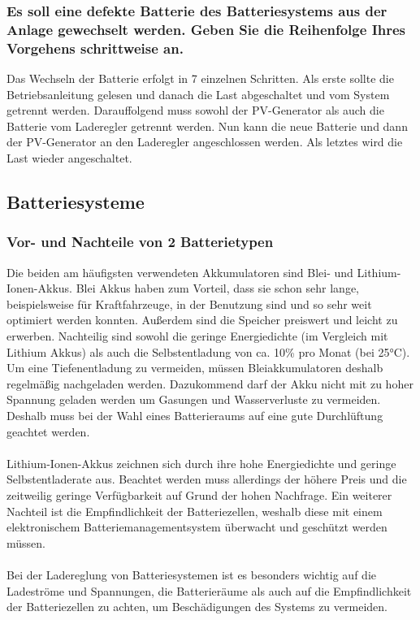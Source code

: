 \subsubsection{Es soll eine defekte Batterie des Batteriesystems aus der Anlage gewechselt werden. Geben Sie die Reihenfolge Ihres Vorgehens schrittweise an.}
Das Wechseln der Batterie erfolgt in 7 einzelnen Schritten. Als erste sollte die Betriebsanleitung gelesen und danach die Last abgeschaltet und vom System getrennt werden. Darauffolgend muss sowohl der PV-Generator als auch die Batterie vom Laderegler getrennt werden. Nun kann die neue Batterie und dann der PV-Generator an den Laderegler angeschlossen werden. Als letztes wird die Last wieder angeschaltet.

\subsection{Batteriesysteme}
\subsubsection{Vor- und Nachteile von 2 Batterietypen}
Die beiden am häufigsten verwendeten Akkumulatoren sind Blei- und Lithium-Ionen-Akkus.
Blei Akkus haben zum Vorteil, dass sie schon sehr lange, beispielsweise für Kraftfahrzeuge, in der Benutzung sind und so sehr weit optimiert werden konnten. Außerdem sind die Speicher preiswert und leicht zu erwerben. Nachteilig sind sowohl die geringe Energiedichte (im Vergleich mit Lithium Akkus) als auch die Selbstentladung von ca. 10\% pro Monat (bei 25°C). Um eine Tiefenentladung zu vermeiden, müssen Bleiakkumulatoren deshalb regelmäßig nachgeladen werden. Dazukommend darf der Akku nicht mit zu hoher Spannung geladen werden um Gasungen und Wasserverluste zu vermeiden. Deshalb muss bei der Wahl eines Batterieraums auf eine gute Durchlüftung geachtet werden.\\\\
Lithium-Ionen-Akkus zeichnen sich durch ihre hohe Energiedichte und geringe Selbstentladerate aus. Beachtet werden muss allerdings der höhere Preis und die zeitweilig geringe Verfügbarkeit auf Grund der hohen Nachfrage. Ein weiterer Nachteil ist die Empfindlichkeit der Batteriezellen, weshalb diese mit einem elektronischem Batteriemanagementsystem überwacht und geschützt werden müssen.\\\\
Bei der Ladereglung von Batteriesystemen ist es besonders wichtig auf die Ladeströme und Spannungen, die Batterieräume als auch auf die Empfindlichkeit der Batteriezellen zu achten, um Beschädigungen des Systems zu vermeiden.

